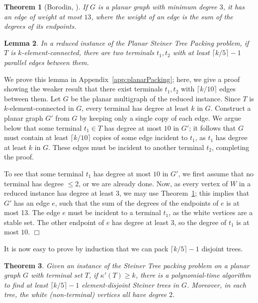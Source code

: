 \documentclass[11pt]{article}
\newtheorem{lemma}{Lemma}[section]
\newtheorem{theorem}[lemma]{Theorem}
\newcommand{\elconn}{\kappa'}
\renewenvironment{proof}{\vspace{-0.1in}\noindent{\bf Proof:}}{\hspace*{\fill}$\Box$\par}
\def\ceil#1{\lceil {#1} \rceil}
\begin{document}
\begin{theorem}[Borodin, \cite {Borodin}]
  \label{thm:Borodin}
  If $G$ is a planar graph with minimum degree $3$, it has an edge of
  weight at most $13$, where the weight of an edge is the sum of the
  degrees of its endpoints.
\end{theorem}

\begin{lemma} \label{lem:parallelEdges} 
  In a reduced instance of the Planar Steiner Tree Packing problem, if
  $T$ is $k$-element-connected, there are two terminals $t_1, t_2$
  with at least $\ceil{k/5} - 1$ parallel edges between them.
\end{lemma}

\begin{proof}
  We prove this lemma in Appendix~\ref{app:planarPacking}; here, we
  give a proof showing the weaker result that there exist terminals
  $t_1, t_2$ with $\ceil{k/10}$ edges between them. Let $G$ be the
  planar multigraph of the reduced instance. Since $T$ is
  $k$-element-connected in $G$, every terminal has degree at least $k$
  in $G$. Construct a planar graph $G'$ from $G$ by keeping only a
  single copy of each edge. We argue below that some terminal $t_1 \in
  T$ has degree at most $10$ in $G'$; it follows that $G$ must contain
  at least $\ceil{k/10}$ copies of some edge incident to $t_1$, as
  $t_1$ has degree at least $k$ in $G$. These edges must be incident
  to another terminal $t_2$, completing the proof.

  To see that some terminal $t_1$ has degree at most $10$ in $G'$, we
  first assume that no terminal has degree $\le 2$, or we are already
  done. Now, as every vertex of $W$ in a reduced instance has degree
  at least $3$, we may use Theorem~\ref{thm:Borodin}; this implies
  that $G'$ has an edge $e$, such that the sum of the degrees of the
  endpoints of $e$ is at most 13. The edge $e$ must be incident to a
  terminal $t_1$, as the white vertices are a stable set. The other
  endpoint of $e$ has degree at least $3$, so the degree of $t_1$ is
  at most $10$.
\end{proof}

It is now easy to prove by induction that we can pack $\ceil{k/5} -
1$ disjoint trees.

\begin{theorem}\label{thm:planarTreePacking}
  Given an instance of the Steiner Tree packing problem on a planar
  graph $G$ with terminal set $T$, if $\elconn(T) \ge k$, there is a
  polynomial-time algorithm to find at least $\ceil{k/5} - 1$
  element-disjoint Steiner trees in $G$. Moreover, in each tree, 
  the white (non-terminal) vertices all have degree $2$.
\end{theorem}
\end{document}
